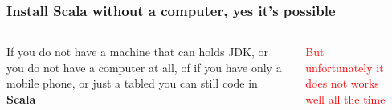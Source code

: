 \documentclass{beamer}
\begin{document}
\begin{frame}
\frametitle{Install Scala without a computer, yes it's possible}

\begin{columns}

If you do not have a machine that can holds JDK, or you do not have a computer at all, of if you have only a mobile phone, or just a tabled you can still code in \textbf{Scala}

\textcolor{red}{But unfortunately it does not works well all the time}
 
 \\
\end{columns}
\end{frame}
\end{document}
